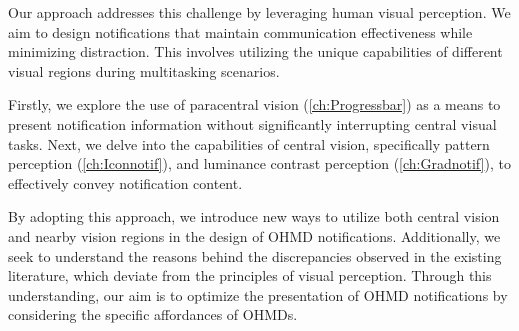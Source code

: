 Our approach addresses this challenge by leveraging human visual perception. We aim to design notifications that maintain communication effectiveness while minimizing distraction. This involves utilizing the unique capabilities of different visual regions during multitasking scenarios.

Firstly, we explore the use of paracentral vision (\autoref{ch:Progressbar}) as a means to present notification information without significantly interrupting central visual tasks. Next, we delve into the capabilities of central vision, specifically pattern perception (\autoref{ch:Iconnotif}), and luminance contrast perception (\autoref{ch:Gradnotif}), to effectively convey notification content.

By adopting this approach, we introduce new ways to utilize both central vision and nearby vision regions in the design of OHMD notifications. Additionally, we seek to understand the reasons behind the discrepancies observed in the existing literature, which deviate from the principles of visual perception. Through this understanding, our aim is to optimize the presentation of OHMD notifications by considering the specific affordances of OHMDs.